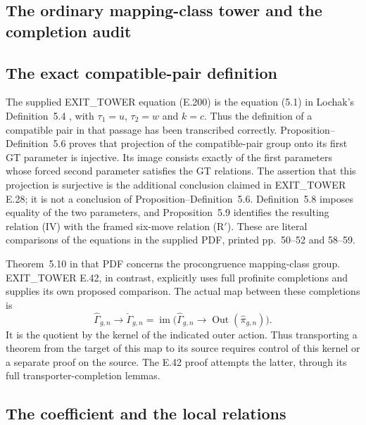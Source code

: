\subsection{The ordinary mapping-class tower and the completion audit}
\label{sec:tower-audit}

\subsection{The exact compatible-pair definition}

The supplied EXIT\_TOWER equation (E.200) is the equation (5.1) in
Lochak's Definition~5.4 \cite{Lochak2025Aut}, with
$\tau _1=u$, $\tau _2=w$ and $k=c$.
Thus the definition of a compatible pair in that passage has been
transcribed correctly.  Proposition--Definition~5.6 proves that projection
of the compatible-pair group onto its first GT parameter is injective.
Its image consists exactly of the first parameters whose forced second
parameter satisfies the GT relations.  The assertion that this projection
is surjective is the additional conclusion claimed in EXIT\_TOWER E.28;
it is not a conclusion of Proposition--Definition~5.6.  Definition~5.8
imposes equality of the two parameters, and Proposition~5.9 identifies the
resulting relation (IV) with the framed six-move relation (R$'$).
These are literal comparisons of the equations in the supplied PDF,
printed pp.~50--52 and 58--59.

Theorem~5.10 in that PDF concerns the procongruence mapping-class group.
EXIT\_TOWER E.42, in contrast, explicitly uses full profinite completions
and supplies its own proposed comparison.  The actual map between these
completions is
\[
 \widehat\Gamma_{g,n}\longrightarrow\check\Gamma_{g,n}
 =\operatorname{im}\bigl(\widehat\Gamma_{g,n}
             \longrightarrow\operatorname{Out}(\widehat\pi_{g,n})\bigr).
\]
It is the quotient by the kernel of the indicated outer action.  Thus
transporting a theorem from the target of this map to its source requires
control of this kernel or a separate proof on the source.  The E.42 proof
attempts the latter, through its full transporter-completion lemmas.

\subsection{The coefficient and the local relations}

